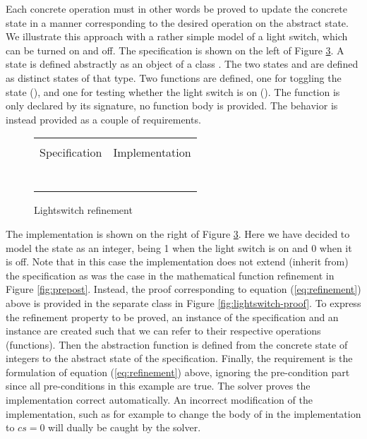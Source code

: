 \noindent
Each concrete operation must in other words be proved to update the concrete state
in a manner corresponding to the desired operation on the abstract state.
We illustrate this approach with a rather simple \Klang{} model of a light switch,
which can be turned on and off.  The specification is shown on the left of
Figure \ref{fig:lightswitch}. A state is defined abstractly as an object of 
a class . The two states  and  are defined as 
distinct states of that type. Two functions are defined, one for toggling
the state (), and one for testing whether the light switch is on
(). The  function is only declared by its signature, no 
function body is provided. The behavior is instead provided  as a couple of
requirements.

\begin{figure}
  \centering
  \begin{tabular}[c]{c|c}
    \hline \\
    Specification & Implementation \\
    \hline\hline \\ \\
    \begin{subfigure}[c]{0.5\textwidth}
     
      \label{fig:lightswitch1}
    \end{subfigure}
    &
    \begin{subfigure}[c]{0.5\textwidth}
      
      \label{fig:lightswicth2}
    \end{subfigure}
    \\ \\
    \hline
  \end{tabular}    
  \caption{Lightswitch refinement}
  \label{fig:lightswitch}
\end{figure}

The implementation is shown on the right of Figure \ref{fig:lightswitch}.
Here we have decided to model the state as an integer, being 1 when the light 
switch is on and 0 when it is off. Note that in this case the implementation
does not extend (inherit from) the specification as was the case in the 
mathematical function refinement in Figure \ref{fig:prepost}. Instead, the
proof corresponding to equation (\ref{eq:refinement}) above is provided
in the separate class  in Figure \ref{fig:lightswitch-proof}.
To express the refinement property to be proved, an instance  of the
specification and an instance  are created such that we can refer to their respective operations (functions). Then the abstraction function  is defined from the concrete state of integers to the abstract state 
of the specification. Finally, the requirement is the \Klang{} formulation of 
equation (\ref{eq:refinement}) above, ignoring the pre-condition part since all
pre-conditions in this example are true. The \Klang{} solver proves the
implementation correct automatically. An incorrect modification of the implementation, such as for example to change the body of  in 
the implementation to $cs = 0$ will dually be caught by the solver.


